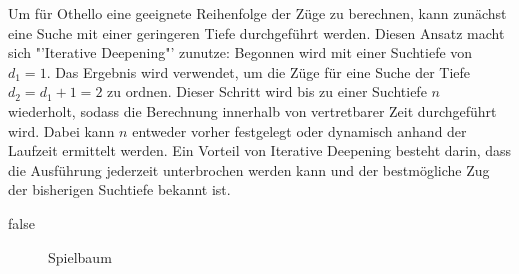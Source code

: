 Um für Othello eine geeignete Reihenfolge der Züge zu berechnen, kann zunächst eine Suche mit einer geringeren Tiefe
durchgeführt werden. Diesen Ansatz macht sich "'Iterative Deepening"' zunutze: Begonnen wird mit einer Suchtiefe von
$d_1=1$. Das Ergebnis wird verwendet, um die Züge für eine Suche der Tiefe $d_2=d_1+1=2$ zu ordnen. Dieser Schritt wird
bis zu einer Suchtiefe $n$ wiederholt, sodass die Berechnung innerhalb von vertretbarer Zeit durchgeführt wird. Dabei
kann $n$ entweder vorher festgelegt oder dynamisch anhand der Laufzeit ermittelt werden. Ein Vorteil von Iterative
Deepening besteht darin, dass die Ausführung jederzeit unterbrochen werden kann und der bestmögliche Zug der bisherigen
Suchtiefe bekannt ist.
\cite{alphabetaefficiency}

\ifx false
\begin{figure}[]
    \centering
    \caption{Spielbaum}
    \label{fig:game_tree}
\end{figure}
\fi


